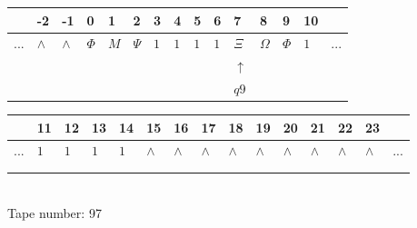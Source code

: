 \documentclass[11pt]{article}
\begin{document}
\begin{table}[H]
\centering
\begin{tabular}{lllllllllllllll}
 & -2 & -1 & 0 & 1 & 2 & 3 & 4 & 5 & 6 & 7 & 8 & 9 & 10 & \\
\hline
$...$ & \multicolumn{1}{|l|}{$\wedge$} & \multicolumn{1}{|l|}{$\wedge$} & \multicolumn{1}{|l|}{$\Phi$} & \multicolumn{1}{|l|}{$M$} & \multicolumn{1}{|l|}{$\Psi$} & \multicolumn{1}{|l|}{$1$} & \multicolumn{1}{|l|}{$1$} & \multicolumn{1}{|l|}{$1$} & \multicolumn{1}{|l|}{$1$} & \multicolumn{1}{|l|}{$\Xi$} & \multicolumn{1}{|l|}{$\Omega$} & \multicolumn{1}{|l|}{$\Phi$} & \multicolumn{1}{|l|}{$1$} & $...$\\
\hline
&  &  &  &  &  &  &  &  &  & $\uparrow$ &  &  &  &  \\
&  &  &  &  &  &  &  &  &  & $ q9 $ &  &  &  &  \\
\end{tabular}
\begin{tabular}{lllllllllllllll}
 & 11 & 12 & 13 & 14 & 15 & 16 & 17 & 18 & 19 & 20 & 21 & 22 & 23 & \\
\hline
$...$ & \multicolumn{1}{|l|}{$1$} & \multicolumn{1}{|l|}{$1$} & \multicolumn{1}{|l|}{$1$} & \multicolumn{1}{|l|}{$1$} & \multicolumn{1}{|l|}{$\wedge$} & \multicolumn{1}{|l|}{$\wedge$} & \multicolumn{1}{|l|}{$\wedge$} & \multicolumn{1}{|l|}{$\wedge$} & \multicolumn{1}{|l|}{$\wedge$} & \multicolumn{1}{|l|}{$\wedge$} & \multicolumn{1}{|l|}{$\wedge$} & \multicolumn{1}{|l|}{$\wedge$} & \multicolumn{1}{|l|}{$\wedge$} & $...$\\
\hline
&  &  &  &  &  &  &  &  &  &  &  &  &  &  \\
&  &  &  &  &  &  &  &  &  &  &  &  &  &  \\
\end{tabular}
\\
Tape number: 97
\noindent\makebox[\linewidth]{\hdashrule{\textwidth}{1pt}{1pt}}\end{table}
\end{document}
